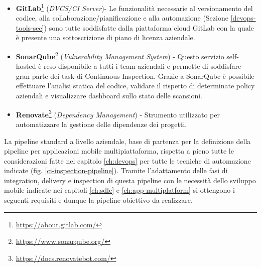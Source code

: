 \begin{itemize}
    \item \textbf{GitLab}\footnote{\href{https://about.gitlab.com/}{https://about.gitlab.com/}} (\textit{DVCS/CI Server})- Le funzionalità necessarie al versionamento del codice, alla collaborazione/pianificazione e alla automazione (Sezione \ref{devops-tools-sec}) sono tutte soddisfatte dalla piattaforma cloud GitLab con la quale è presente una sottoscrizione di piano di licenza aziendale.
    \item \textbf{SonarQube}\footnote{\href{https://www.sonarqube.org/}{https://www.sonarqube.org/}} (\textit{Vulnerability Management System}) - Questo servizio self-hosted è reso disponibile a tutti i team aziendali e permette di soddisfare gran parte dei task di Continuous Inspection. Grazie a SonarQube è possibile effettuare l'analisi statica del codice, validare il rispetto di determinate policy aziendali e visualizzare dashboard sullo stato delle scansioni.
    \item \textbf{Renovate}\footnote{\href{https://docs.renovatebot.com/}{https://docs.renovatebot.com/}} (\textit{Dependency Management}) - Strumento utilizzato per automatizzare la gestione delle dipendenze dei progetti. 
\end{itemize}

La pipeline standard a livello aziendale, base di partenza per la definizione della pipeline per applicazioni mobile multipiattaforma, rispetta a pieno tutte le considerazioni fatte nel capitolo \ref{ch:devops} per tutte le tecniche di automazione indicate (fig. \ref{ci-inspection-pipeline}). Tramite l'adattamento delle fasi di integration, delivery e inspection di questa pipeline con le necessità dello sviluppo mobile indicate nei capitoli \ref{ch:sdlc} e \ref{ch:app-multiplatform} si ottengono i seguenti requisiti e dunque la pipeline obiettivo da realizzare.

